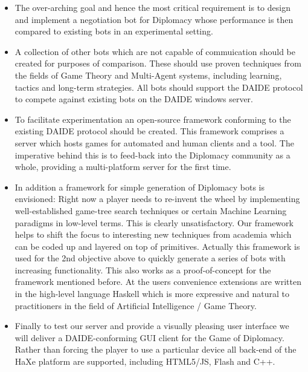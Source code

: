 \documentclass[11pt]{article}
\begin{document}
\begin{itemize}

\item The over-arching goal and hence the most critical requirement is to 
      design and implement a negotiation bot for Diplomacy whose performance
      is then compared to existing bots in an experimental setting. 
\item A collection of other bots which are not capable of commuication should
      be created for purposes of comparison. These should use proven techniques
      from the fields of Game Theory and Multi-Agent systems, including learning,
      tactics and long-term strategies. All bots should support the DAIDE 
      protocol to compete against existing bots on the DAIDE windows server.
\item To facilitate experimentation an open-source framework conforming to the
      existing DAIDE protocol should be created. This framework comprises a 
      server which hosts games for automated and human clients and a tool. The
      imperative behind this is to feed-back into the Diplomacy community as 
      a whole, providing a multi-platform server for the first time. 
\item In addition a framework for simple generation of Diplomacy bots is 
      envisioned: Right now a player needs to re-invent the wheel by 
      implementing well-established game-tree search techniques or certain
      Machine Learning paradigms in low-level terms. This is clearly 
      unsatisfactory. Our framework helps to shift the focus to interesting
      new techniques from academia which can be coded up and layered on top
      of primitives. Actually this framework is used for the 2nd objective above
      to quickly generate a series of bots with increasing functionality. 
      This also works as a proof-of-concept for the framework mentioned before. 
      At the users convenience extensions are written in the high-level language
      Haskell which is more expressive and natural to practitioners in the
      field of Artificial Intelligence / Game Theory.  
\item Finally to test our server and provide a visually pleasing user interface
      we will deliver a DAIDE-conforming GUI client for the Game of Diplomacy. 
      Rather than forcing the player to use a particular device all back-end
      of the HaXe platform are supported, including HTML5/JS, Flash and C++. 

\end{itemize}
\end{document}
